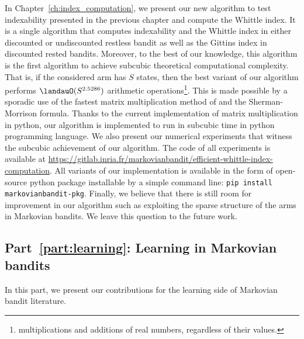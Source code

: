 In Chapter~\ref{ch:index_computation}, we present our new algorithm to test indexability presented in the previous chapter and compute the Whittle index.
It is a single algorithm that computes indexability and the Whittle index in either discounted or undiscounted restless bandit as well as the Gittins index in discounted rested bandits.
Moreover, to the best of our knowledge, this algorithm is the first algorithm to achieve subcubic theoretical computational complexity.
That is, if the considered arm has $S$ states, then the best variant of our algorithm performs $\landauO(S^{2.5286})$ arithmetic operations\footnote{multiplications and additions of real numbers, regardless of their values.}.
This is made possible by a sporadic use of the fastest matrix multiplication method of \cite{coppersmith1987matrix} and the Sherman-Morrison formula.
Thanks to the current implementation of matrix multiplication in python, our algorithm is implemented to run in subcubic time in python programming language.
We also present our numerical experiments that witness the subcubic achievement of our algorithm.
The code of all experiments is available at \url{https://gitlab.inria.fr/markovianbandit/efficient-whittle-index-computation}.
All variants of our implementation is available in the form of open-source python package installable by a simple command line: \texttt{pip install markovianbandit-pkg}.
Finally, we believe that there is still room for improvement in our algorithm such as exploiting the sparse structure of the arms in Markovian bandits.
We leave this question to the future work.

\subsection{Part~{\ref{part:learning}}: Learning in Markovian bandits}

In this part, we present our contributions for the learning side of Markovian bandit literature.

